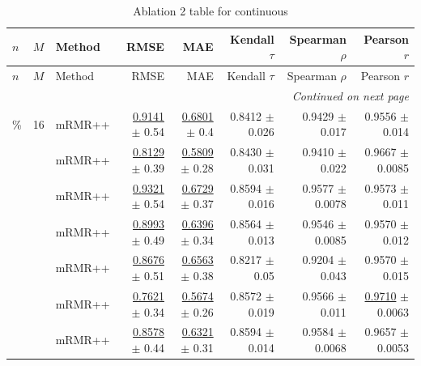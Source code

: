 \footnotesize
\setlength{\tabcolsep}{2pt}
\renewcommand{\arraystretch}{1.05}
\setlength{\LTpre}{0pt}
\setlength{\LTpost}{0pt}
\setlength{\LTleft}{\fill}
\setlength{\LTright}{\fill}
\begin{longtable}{llp{}rrrrr}
\caption{Ablation 2 table for continuous}\label{tab:ablation\_2\_continuous}\\
\toprule
$n$ & $M$ & Method & RMSE & MAE & Kendall $\tau$ & Spearman $\rho$ & Pearson $r$ \\
\midrule
\endfirsthead
\toprule
$n$ & $M$ & Method & RMSE & MAE & Kendall $\tau$ & Spearman $\rho$ & Pearson $r$ \\
\midrule
\endhead
\midrule
\multicolumn{8}{r}{\emph{Continued on next page}} \\
\midrule
\endfoot
\bottomrule
\endlastfoot
5\% & 16 & mRMR++ & \underline{0.9141} {\scriptsize $\pm$ 0.54} & \underline{0.6801} {\scriptsize $\pm$ 0.4} & 0.8412 {\scriptsize $\pm$ 0.026} & 0.9429 {\scriptsize $\pm$ 0.017} & 0.9556 {\scriptsize $\pm$ 0.014} \\
 &  & mRMR++ & \underline{0.8129} {\scriptsize $\pm$ 0.39} & \underline{0.5809} {\scriptsize $\pm$ 0.28} & 0.8430 {\scriptsize $\pm$ 0.031} & 0.9410 {\scriptsize $\pm$ 0.022} & 0.9667 {\scriptsize $\pm$ 0.0085} \\
 &  & mRMR++ & \underline{0.9321} {\scriptsize $\pm$ 0.54} & \underline{0.6729} {\scriptsize $\pm$ 0.37} & 0.8594 {\scriptsize $\pm$ 0.016} & 0.9577 {\scriptsize $\pm$ 0.0078} & 0.9573 {\scriptsize $\pm$ 0.011} \\
 &  & mRMR++ & \underline{0.8993} {\scriptsize $\pm$ 0.49} & \underline{0.6396} {\scriptsize $\pm$ 0.34} & 0.8564 {\scriptsize $\pm$ 0.013} & 0.9546 {\scriptsize $\pm$ 0.0085} & 0.9570 {\scriptsize $\pm$ 0.012} \\
 &  & mRMR++ & \underline{0.8676} {\scriptsize $\pm$ 0.51} & \underline{0.6563} {\scriptsize $\pm$ 0.38} & 0.8217 {\scriptsize $\pm$ 0.05} & 0.9204 {\scriptsize $\pm$ 0.043} & 0.9570 {\scriptsize $\pm$ 0.015} \\
 &  & mRMR++ & \underline{0.7621} {\scriptsize $\pm$ 0.34} & \underline{0.5674} {\scriptsize $\pm$ 0.26} & 0.8572 {\scriptsize $\pm$ 0.019} & 0.9566 {\scriptsize $\pm$ 0.011} & \underline{0.9710} {\scriptsize $\pm$ 0.0063} \\
 &  & mRMR++ & \underline{0.8578} {\scriptsize $\pm$ 0.44} & \underline{0.6321} {\scriptsize $\pm$ 0.31} & 0.8594 {\scriptsize $\pm$ 0.014} & 0.9584 {\scriptsize $\pm$ 0.0068} & 0.9657 {\scriptsize $\pm$ 0.0053} \\

\end{longtable}
